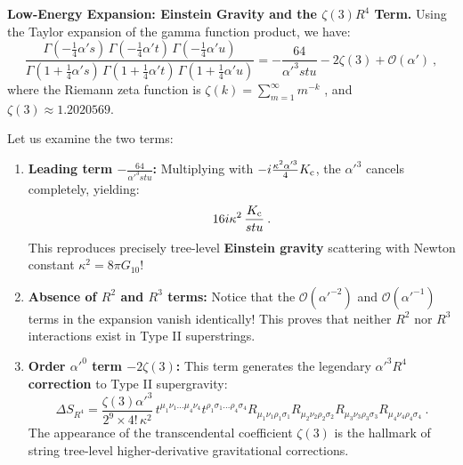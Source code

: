 \begin{tcolorbox}[breakable]
	\begin{remark}
		\textbf{Low-Energy Expansion: Einstein Gravity and the $\zeta(3)R^{4}$ Term.}
		Using the Taylor expansion of the gamma function product, we have:
		\begin{equation}
			\frac{\Gamma(-\frac{1}{4}\alpha's)\,\Gamma(-\frac{1}{4}\alpha't)\,\Gamma(-\frac{1}{4}\alpha'u)}{\Gamma(1+\frac{1}{4}\alpha's)\,\Gamma(1+\frac{1}{4}\alpha't)\,\Gamma(1+\frac{1}{4}\alpha'u)} = -\frac{64}{\alpha'^{3}stu} - 2\zeta(3) + \mathcal{O}(\alpha') \:, \label{12.4.32}
		\end{equation}
		where the Riemann zeta function is $\zeta(k) = \sum_{m=1}^{\infty}m^{-k}$ \label{12.4.33}, and $\zeta(3) \approx 1.2020569$.
		
		Let us examine the two terms:
		\begin{enumerate}
			\item \textbf{Leading term $-\frac{64}{\alpha'^{3}stu}$:} Multiplying with $-i\frac{\kappa^{2}\alpha'^{3}}{4}K_{\mathrm{c}}$, the $\alpha'^{3}$ cancels completely, yielding:
			\[
			16i\kappa^{2}\,\frac{K_{\mathrm{c}}}{stu} \:.
			\]
			This reproduces precisely tree-level \textbf{Einstein gravity} scattering with Newton constant $\kappa^{2} = 8\pi G_{10}$!
			
			\item \textbf{Absence of $R^{2}$ and $R^{3}$ terms:} Notice that the $\mathcal{O}(\alpha'^{-2})$ and $\mathcal{O}(\alpha'^{-1})$ terms in the expansion vanish identically! This proves that neither $R^{2}$ nor $R^{3}$ interactions exist in Type II superstrings.
			
			\item \textbf{Order $\alpha'^{0}$ term $-2\zeta(3)$:} This term generates the legendary \textbf{$\alpha'^{3}R^{4}$ correction} to Type II supergravity:
			\begin{equation}
				\Delta S_{R^{4}} = \frac{\zeta(3)\alpha'^{3}}{2^{9}\times 4!\,\kappa^{2}}\,t^{\mu_{1}\nu_{1}\dots\mu_{4}\nu_{4}}t^{\rho_{1}\sigma_{1}\dots\rho_{4}\sigma_{4}}R_{\mu_{1}\nu_{1}\rho_{1}\sigma_{1}}R_{\mu_{2}\nu_{2}\rho_{2}\sigma_{2}}R_{\mu_{3}\nu_{3}\rho_{3}\sigma_{3}}R_{\mu_{4}\nu_{4}\rho_{4}\sigma_{4}} \:. \label{12.4.34}
			\end{equation}
			The appearance of the transcendental coefficient $\zeta(3)$ is the hallmark of string tree-level higher-derivative gravitational corrections.
		\end{enumerate}
	\end{remark}
\end{tcolorbox}

